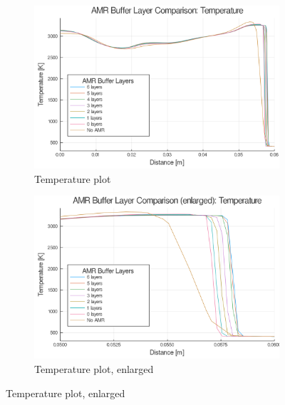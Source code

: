 \begin{figure} \ContinuedFloat

    \centering
    \begin{subfigure}[]{\textwidth}
        \centering
        \includegraphics[width=\textwidth]{./figs/amrfigs/amr_bufflayers/t.png}
        \caption{Temperature plot}
    \end{subfigure}

    \centering
    \begin{subfigure}[]{\textwidth}
        \centering
        \includegraphics[width=\textwidth]{./figs/amrfigs/amr_bufflayers/te.png}
        \caption{Temperature plot, enlarged}
    \end{subfigure}

\end{figure}
